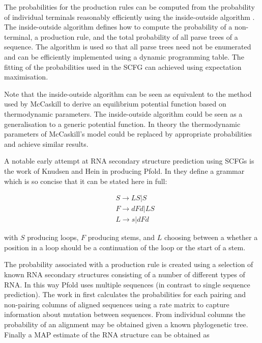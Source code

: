 \documentclass[journal]{IEEEtran}
\begin{document}
The probabilities for the production rules can be computed from the probability of individual terminals reasonably efficiently using the inside-outside algorithm \cite{lari1990estimation}. The inside-outside algorithm defines how to compute the probability of a non-terminal, a production rule, and the total probability of all parse trees of a sequence. The algorithm is used so that all parse trees need not be enumerated and can be efficiently implemented using a dynamic programming table. The fitting of the probabilities used in the SCFG can achieved using expectation maximisation. 

Note that the inside-outside algorithm can be seen as equivalent to the method used by McCaskill \cite{mccaskill1990equilibrium} to derive an equilibrium potential function based on thermodynamic parameters. The inside-outside algorithm could be seen as a generalisation to a generic potential function. In theory the thermodynamic parameters of McCaskill's model could be replaced by appropriate probabilities and achieve similar results.

A notable early attempt at RNA secondary structure prediction using SCFGs is the work of Knudsen and Hein \cite{knudsen1999rna, knudsen2003pfold} in producing Pfold. In \cite{knudsen1999rna} they define a grammar which is so concise that it can be stated here in full:

\begin{equation}
\begin{split}
	& S \rightarrow LS | S \\
	& F \rightarrow dFd | LS \\
	& L \rightarrow s | dFd 
\end{split}
\end{equation}

with $S$ producing loops, $F$ producing stems, and $L$ choosing between a whether a position in a loop should be a continuation of the loop or the start of a stem.

The probability associated with a production rule is created using a selection of known RNA secondary structures consisting of a number of different types of RNA. In this way Pfold uses multiple sequences (in contrast to single sequence prediction). The work in \cite{knudsen1999rna} first calculates the probabilities for each pairing and non-pairing columns of aligned sequences using a rate matrix to capture information about mutation between sequences. From individual columns the probability of an alignment may be obtained given a known phylogenetic tree. Finally a MAP estimate of the RNA structure can be obtained as
\end{document}
